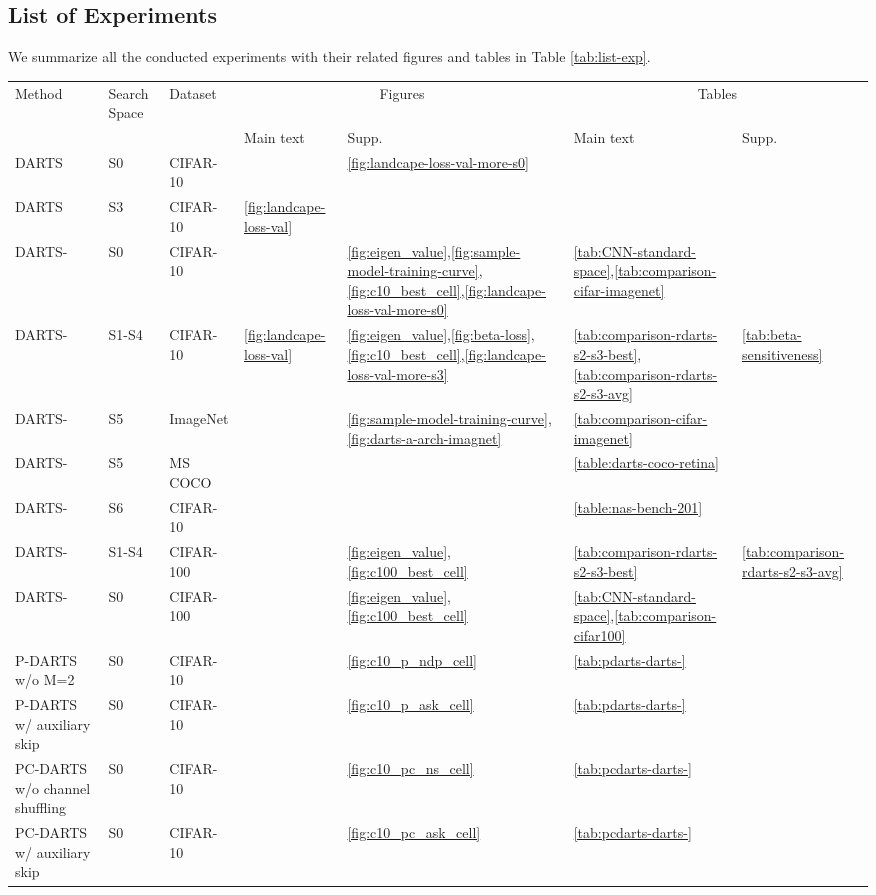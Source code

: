 \documentclass{article} \usepackage{iclr2021_conference,times}
\begin{document}
\subsection{List of Experiments}

We summarize all the conducted experiments with their related figures and tables in Table \ref{tab:list-exp}.

\begin{table*}[ht]
\centering
\caption{List of experiments conducted in this paper}\smallskip
\small
\begin{tabular}{*{7}{l}}
\toprule
Method & Search Space & Dataset &  \multicolumn{2}{c}{Figures}  &  \multicolumn{2}{c}{Tables} \\ 
& &  &  \scriptsize{Main text} &  \scriptsize{Supp.} & \scriptsize{Main text} &  \scriptsize{Supp.} \\
\midrule
DARTS & S0 & CIFAR-10 &  &\ref{fig:landcape-loss-val-more-s0} &  & \\
DARTS & S3 & CIFAR-10 & \ref{fig:landcape-loss-val} & &  & \\
DARTS- & S0 &  CIFAR-10 & & \ref{fig:eigen_value},\ref{fig:sample-model-training-curve},\ref{fig:c10_best_cell},\ref{fig:landcape-loss-val-more-s0}  &\ref{tab:CNN-standard-space},\ref{tab:comparison-cifar-imagenet} & \\
DARTS- & S1-S4 &  CIFAR-10 &  \ref{fig:landcape-loss-val} &\ref{fig:eigen_value},\ref{fig:beta-loss},\ref{fig:c10_best_cell},\ref{fig:landcape-loss-val-more-s3} & \ref{tab:comparison-rdarts-s2-s3-best},\ref{tab:comparison-rdarts-s2-s3-avg} & \ref{tab:beta-sensitiveness} \\
DARTS- & S5 &  ImageNet & & \ref{fig:sample-model-training-curve},\ref{fig:darts-a-arch-imagnet} & \ref{tab:comparison-cifar-imagenet} &\\ 
DARTS- & S5 &  MS COCO & & & \ref{table:darts-coco-retina} &\\
DARTS- & S6 & CIFAR-10 & &  & \ref{table:nas-bench-201} & \\
DARTS- & S1-S4 &  CIFAR-100 & & \ref{fig:eigen_value},\ref{fig:c100_best_cell}   &\ref{tab:comparison-rdarts-s2-s3-best} &  \ref{tab:comparison-rdarts-s2-s3-avg} \\
DARTS- & S0 &  CIFAR-100 & &\ref{fig:eigen_value},\ref{fig:c100_best_cell} & \ref{tab:CNN-standard-space},\ref{tab:comparison-cifar100} &\\
P-DARTS w/o M=2      & S0  & CIFAR-10 & & \ref{fig:c10_p_ndp_cell} & \ref{tab:pdarts-darts-}  &\\ 
P-DARTS w/ auxiliary skip & S0  &CIFAR-10 &  &\ref{fig:c10_p_ask_cell}  & \ref{tab:pdarts-darts-} &\\
PC-DARTS w/o channel shuffling & S0 &CIFAR-10 & & \ref{fig:c10_pc_ns_cell}   & \ref{tab:pcdarts-darts-}  &\\
PC-DARTS w/ auxiliary skip & S0  & CIFAR-10 &  &\ref{fig:c10_pc_ask_cell}   &  \ref{tab:pcdarts-darts-} & \\
\bottomrule
\end{tabular}
\label{tab:list-exp}
\end{table*}
\end{document}
